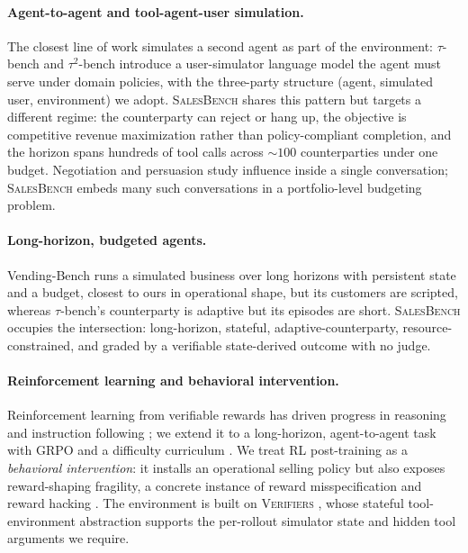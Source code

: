 \documentclass{article} %
\newcommand{\salesbench}{\textsc{SalesBench}}
\begin{document}
\paragraph{Agent-to-agent and tool-agent-user simulation.} The closest line of work simulates a second agent as part
of the environment: $\tau$-bench and $\tau^2$-bench \citep{yao2024taubench, barres2025tau2bench} introduce a
user-simulator language model the agent must serve under domain policies, with the three-party structure (agent,
simulated user, environment) we adopt. \salesbench{} shares this pattern but targets a different regime: the
counterparty can reject or hang up, the objective is competitive revenue maximization rather than policy-compliant
completion, and the horizon spans hundreds of tool calls across ${\sim}100$ counterparties under one budget.
Negotiation and persuasion \citep{lewis2017deal, wang2019persuasion, bakhtin2022cicero} study influence inside a single
conversation; \salesbench{} embeds many such conversations in a portfolio-level budgeting problem.

\paragraph{Long-horizon, budgeted agents.} Vending-Bench \citep{backlund2025vending} runs a simulated business over
long horizons with persistent state and a budget, closest to ours in operational shape, but its customers are scripted,
whereas $\tau$-bench's counterparty is adaptive but its episodes are short. \salesbench{} occupies the intersection:
long-horizon, stateful, adaptive-counterparty, resource-constrained, and graded by a verifiable state-derived outcome
with no judge.

\paragraph{Reinforcement learning and behavioral intervention.} Reinforcement learning from verifiable rewards has
driven progress in reasoning and instruction following \citep{shao2024deepseekmath, lambert2024tulu3}; we extend it to
a long-horizon, agent-to-agent task with GRPO \citep{shao2024deepseekmath} and a difficulty curriculum
\citep{bengio2009curriculum}. We treat RL post-training as a \emph{behavioral intervention}: it installs an operational
selling policy but also exposes reward-shaping fragility, a concrete instance of reward misspecification and reward
hacking \citep{pan2022reward, skalse2022reward, krakovna2020specification, pan2024feedback}. The environment is built
on \textsc{Verifiers} \citep{brown2025verifiers}, whose stateful tool-environment abstraction supports the per-rollout
simulator state and hidden tool arguments we require.
\end{document}

